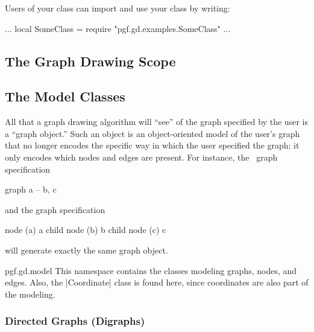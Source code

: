 Users of your class can import and use your class by writing:
\begin{codeexample}[code only, tikz syntax=false]
...
local SomeClass = require "pgf.gd.examples.SomeClass"
...  
\end{codeexample}




\subsection{The Graph Drawing Scope}

\label{section-gd-gd-scope}




\subsection{The Model Classes}

\label{section-gd-models}

All that a graph drawing algorithm will ``see'' of the graph specified
by the user is a ``graph object.'' Such an object is an
object-oriented model of the user's graph that no longer encodes the
specific way in which the user specified the graph; it only encodes
which nodes and edges are present. For instance, the \tikzname\ graph
specification 
\begin{codeexample}
graph { a -- {b, c} }
\end{codeexample}
\noindent and the graph specification
\begin{codeexample}
node (a) { a }
child { node (b) {b} }
child { node (c) {c} }
\end{codeexample}
will generate exactly the same graph object.

\begin{luanamespace}{pgf.gd.}{model}
  This namespace contains the classes modeling graphs,
  nodes, and edges. Also, the |Coordinate| class is found here, since
  coordinates are also part of the modeling.  
\end{luanamespace}


\subsubsection{Directed Graphs (Digraphs)}

